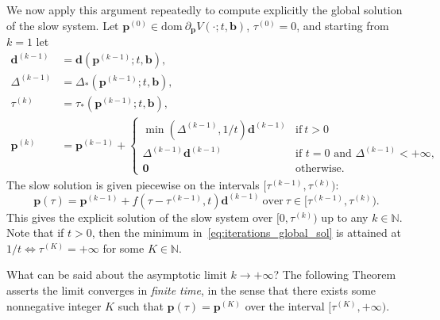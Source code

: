 \documentclass[11pt]{article}
\numberwithin{prop}{section}
\numberwithin{lem}{section}
\numberwithin{rem}{section}
\numberwithin{cor}{section}
\numberwithin{thm}{section}
\numberwithin{defn}{section}
\numberwithin{fact}{section}
\theoremstyle{plain}
\def\bb {\boldsymbol{b}}
\def\bd {\boldsymbol{d}}
\def\bp {\boldsymbol{p}}
\def\dom {\mathrm{dom~}}    %
\begin{document}
We now apply this argument repeatedly to compute explicitly the global solution of the slow system. Let $\bp^{(0)} \in \dom \partial_{\bp}V(\cdot;t,\bb)$, $\tau^{(0)} = 0$, and starting from $k=1$ let
\begin{equation}\label{eq:iterations_global_sol}
\begin{alignedat}{1}
	\bd^{(k-1)} &= \bd(\bp^{(k-1)};t,\bb),\\
	\Delta^{(k-1)} &= \Delta_{*}(\bp^{(k-1)};t,\bb),\\
	\tau^{(k)} &= \tau_{*}(\bp^{(k-1)};t,\bb),\\
	\bp^{(k)} &= \bp^{(k-1)} 
+ \begin{cases}
 	\min\left(\Delta^{(k-1)},1/t\right)\bd^{(k-1)} & \text{if} \ t>0 \\
 	\Delta^{(k-1)}\bd^{(k-1)} & \text{if $t = 0$ and $\Delta^{(k-1)} < +\infty$}, \\
 	\boldsymbol{0} & \text{otherwise.}
 \end{cases}
\end{alignedat}
\end{equation} 
The slow solution is given piecewise on the intervals $[\tau^{(k-1)},\tau^{(k)})$:
\begin{equation}\label{eq:slow_global_solution}
\bp(\tau) = \bp^{(k-1)} + f(\tau - \tau^{(k-1)},t)\bd^{(k-1)} \ \text{over} \ \tau \in [\tau^{(k-1)},\tau^{(k)}).
\end{equation}
This gives the explicit solution of the slow system over $[0,\tau^{(k)})$ up to any $k \in \mathbb{N}$. Note that if $t>0$, then the minimum in~\eqref{eq:iterations_global_sol} is attained at $1/t \iff \tau^{(K)} = +\infty$ for some $K \in \mathbb{N}$.


What can be said about the asymptotic limit $k\to+\infty$? The following Theorem asserts the limit converges in \emph{finite time}, in the sense that there exists some nonnegative integer $K$ such that $\bp(\tau) = \bp^{(K)}$ over the interval $[\tau^{(K)},+\infty)$.
\end{document}
